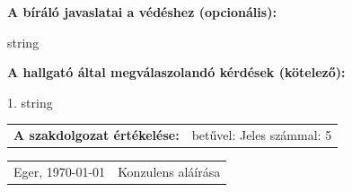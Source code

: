 \documentclass[a4paper,12pt]{article}
\begin{document}
\bigskip


\textbf{A bíráló javaslatai a védéshez (opcionális):}

\vspace{0.3cm}

string

\vspace{1cm}

\textbf{A hallgató által megválaszolandó kérdések (kötelező):}

\vspace{0.3cm}

1. string

\vspace{1cm}

\begin{tabularx}{\textwidth}{lX}

\textbf{A szakdolgozat értékelése:} &
betűvel: Jeles
\hspace{1cm}
számmal: 5

\end{tabularx}

\vspace{1.5cm}

\begin{tabularx}{\textwidth}{X X}

Eger, \today &
\hfill Konzulens aláírása

\end{tabularx}
\end{document}
